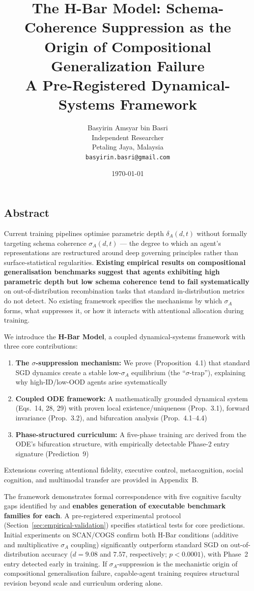\documentclass[11pt,a4paper]{article}
\title{\textbf{The H-Bar Model: Schema-Coherence Suppression as the\\
Origin of Compositional Generalization Failure}\\[6pt]
\large A Pre-Registered Dynamical-Systems Framework}
\author{
  Basyirin Amsyar bin Basri\\
  Independent Researcher\\
  Petaling Jaya, Malaysia\\
  \texttt{basyirin.basri@gmail.com}
}
\date{\today}
\begin{document}
\maketitle

\subsection*{Abstract}

Current training pipelines optimise parametric depth $\delta_A(d,t)$
without formally targeting schema coherence $\sigma_A(d,t)$ --- the degree
to which an agent's representations are restructured around deep governing
principles rather than surface-statistical regularities.
\textbf{Existing empirical results on compositional generalisation
benchmarks suggest that agents exhibiting high parametric depth but
low schema coherence tend to fail systematically} on out-of-distribution
recombination tasks that standard in-distribution metrics do not detect.
No existing framework specifies the mechanisms by which $\sigma_A$ forms,
what suppresses it, or how it interacts with attentional allocation
during training.

We introduce the \textbf{H-Bar Model}, a coupled dynamical-systems
framework with three core contributions:
\begin{enumerate}[nosep]
\item \textbf{The $\sigma$-suppression mechanism:} We prove (Proposition~4.1) that standard SGD dynamics create a stable low-$\sigma_A$ equilibrium (the ``$\sigma$-trap''), explaining why high-ID/low-OOD agents arise systematically
\item \textbf{Coupled ODE framework:} A mathematically grounded dynamical system (Eqs.~14, 28, 29) with proven local existence/uniqueness (Prop.~3.1), forward invariance (Prop.~3.2), and bifurcation analysis (Prop.~4.1--4.4)
\item \textbf{Phase-structured curriculum:} A five-phase training arc derived from the ODE's bifurcation structure, with empirically detectable Phase-2 entry signature (Prediction~9)
\end{enumerate}
Extensions covering attentional fidelity, executive control, metacognition,
social cognition, and multimodal transfer are provided in Appendix~B.

The framework demonstrates formal correspondence with five cognitive
faculty gaps identified by \cite{burnell2026measuringprogressagi} and
\textbf{enables generation of executable benchmark families for each}.
A pre-registered experimental protocol (Section~\ref{sec:empirical-validation})
specifies statistical tests for core predictions. Initial experiments on
SCAN/COGS confirm both H-Bar conditions (additive and multiplicative
$\sigma_A$ coupling) significantly outperform standard SGD on
out-of-distribution accuracy ($d = 9.08$ and $7.57$, respectively; $p < 0.0001$), with Phase~2
entry detected early in training. If $\sigma_A$-suppression is the
mechanistic origin of compositional generalisation failure, capable-agent
training requires structural revision beyond scale and curriculum
ordering alone.
\end{document}
